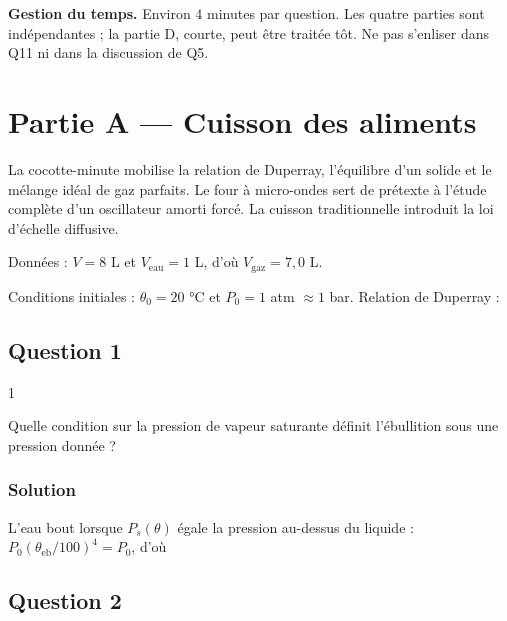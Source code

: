 \documentclass[11pt,a4paper]{article}
\newcommand{\equationajustee}[1]{%
  \sbox{\boiteequation}{$\displaystyle #1$}%
  \ifdim\wd\boiteequation>\linewidth
    \[\resizebox{\linewidth}{!}{\usebox{\boiteequation}}\]%
  \else
    \[#1\]%
  \fi}
\begin{document}
\textbf{Gestion du temps.} Environ 4 minutes par question. Les quatre parties sont indépendantes ; la partie D, courte, peut être traitée tôt. Ne pas s'enliser dans Q11 ni dans la discussion de Q5.

\hypertarget{partie-a-cuisson-des-aliments}{%
\section{Partie A --- Cuisson des aliments}\label{partie-a-cuisson-des-aliments}}

La cocotte-minute mobilise la relation de Duperray, l'équilibre d'un solide et le mélange idéal de gaz parfaits. Le four à micro-ondes sert de prétexte à l'étude complète d'un oscillateur amorti forcé. La cuisson traditionnelle introduit la loi d'échelle diffusive.

Données : \(V=8\) L et \(V_{\mathrm{eau}}=1\) L, d'où \(V_{\mathrm{gaz}}=7{,}0\) L.

Conditions initiales : \(\theta_0=20\) °C et \(P_0=1\) atm \(\approx1\) bar. Relation de Duperray :

\equationajustee{P_s=P_0(\theta/100)^4}

\hypertarget{question-1}{%
\subsection{Question 1}\label{question-1}}

\begin{indication}{1}

Quelle condition sur la pression de vapeur saturante définit l'ébullition sous une pression donnée ?

\end{indication}

\hypertarget{solution}{%
\subsubsection{Solution}\label{solution}}

L'eau bout lorsque \(P_s(\theta)\) égale la pression au-dessus du liquide : \(P_0(\theta_{\mathrm{eb}}/100)^4=P_0\), d'où

\equationajustee{\boxed{\theta_{\mathrm{eb}}=100\ ^\circ\mathrm C\ (373\ \mathrm K)}}

\hypertarget{question-2}{%
\subsection{Question 2}\label{question-2}}
\end{document}
